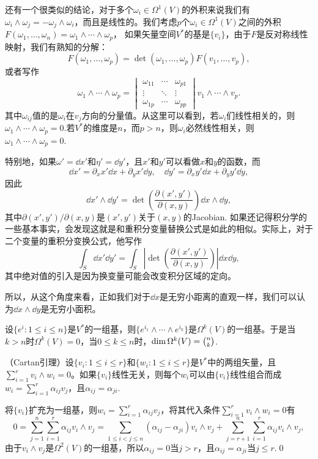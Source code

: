\para 还有一个很类似的结论，对于多个$\omega_i \in \Omega^1(V)$的外积来说我们有$\omega_i \wedge \omega_j=-\omega_j \wedge \omega_i$，而且是线性的。我们考虑$p$个$\omega_i \in \Omega^1(V)$之间的外积$F(\omega_1, \dots,\omega_n)=\omega_1\wedge \cdots \wedge \omega_p$，
如果矢量空间$V^*$的基是$\{v_i\}$，由于$F$是反对称线性映射，我们有熟知的分解：
\[
	F(\omega_1, \dots,\omega_p)=\det(\omega_1, \dots,\omega_p)F(v_1, \dots,v_p),
\]
或者写作
\[
	\omega_1\wedge \cdots \wedge \omega_p=
	\begin{vmatrix}
		\omega_{11}&\cdots&\omega_{p1}\\
		\vdots&\ddots&\vdots\\
		\omega_{1p}&\cdots&\omega_{pp}
	\end{vmatrix}
	v_1\wedge \cdots \wedge v_p.
\]
其中$\omega_{ij}$值的是$\omega_i$在$v_j$方向的分量值。从这里可以看到，若$\omega_i$们线性相关的，则$\omega_1\wedge \cdots \wedge \omega_p=0$.若$V^*$的维度是$n$，而$p>n$，则$\omega_i$必然线性相关，则$\omega_1\wedge \cdots \wedge \omega_p=0$.

\para 特别地，如果$\omega'=\dd x'$和$\eta'=\dd y'$，且$x'$和$y'$可以看做$x$和$y$的函数，而
\[
	\dd x'=\partial_x x' \dd x+\partial_y x' \dd y,\quad \dd y'=\partial_x y' \dd x+\partial_y y' \dd y,
\]
因此
\[
	\dd x'\wedge \dd y'=\det\left(\frac{\partial(x',y')}{\partial (x,y)}\right)\dd x\wedge \dd y,
\]
其中$\partial(x',y')/\partial (x,y)$是$(x',y')$关于$(x,y)$的Jacobian. 如果还记得积分学的一些基本事实，会发现这就是和重积分变量替换公式是如此的相似。实际上，对于二个变量的重积分变换公式，他写作
\[
	\int_S\dd x' \dd y'=\int_S\left|\det\left(\frac{\partial(x',y')}{\partial (x,y)}\right)\right|\dd x \dd y,
\]
其中绝对值的引入是因为换变量可能会改变积分区域的定向。

所以，从这个角度来看，正如我们对于$\dd x$是无穷小距离的直观一样，我们可以认为$\dd x\wedge \dd y$是无穷小面积。

\para 设$\{e^i:1\leq i \leq n\}$是$V^*$的一组基，则$\{e^{i_1}\wedge \cdots \wedge e^{i_k}\}$是$\Omega^k(V)$的一组基。于是当$k>n$时$\Omega^k(V)=0$，当$0\leq k \leq n$时，$\dim \Omega^k(V)=\tbinom nk$.

\lem （Cartan引理）设$\{v_i:1\leq i \leq r\}$和$\{w_i:1\leq i \leq r\}$是$V^*$中的两组矢量，且$\sum_{i=1}^rv_i\wedge w_i=0$。如果$\{v_i\}$线性无关，则每个$w_i$可以由$\{v_i\}$线性组合而成$w_i=\sum_{i=1}^r\alpha_{ij}v_j$，且$\alpha_{ij}=\alpha_{ji}$.

\proof
	将$\{v_i\}$扩充为一组基，则$w_i=\sum_{i=1}^r\alpha_{ij}v_j$，将其代入条件$\sum_{i=1}^rv_i\wedge w_i=0$有
	\[
		0=\sum_{j=1}^n\sum_{i=1}^r \alpha_{ij}v_i \wedge v_j=\sum_{1\leq i < j \leq n}(\alpha_{ij}-\alpha_{ji}) v_i \wedge v_j+\sum_{j=r+1}^n\sum_{i=1}^r \alpha_{ij}v_i \wedge v_j,
	\]
	由于$v_i \wedge v_j$是$\Omega^2(V)$的一组基，所以$\alpha_{ij}=0$当$j>r$，且$\alpha_{ij}=\alpha_{ji}$当$j\leq r$.\qed

